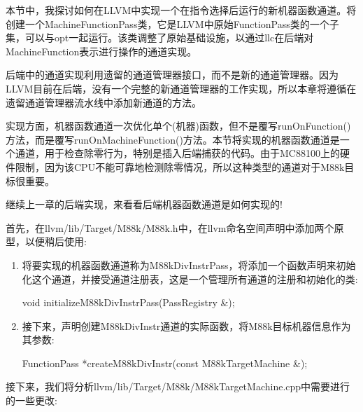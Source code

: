 
本节中，我探讨如何在LLVM中实现一个在指令选择后运行的新机器函数通道。将创建一个MachineFunctionPass类，它是LLVM中原始FunctionPass类的一个子集，可以与opt一起运行。该类调整了原始基础设施，以通过llc在后端对MachineFunction表示进行操作的通道实现。

后端中的通道实现利用遗留的通道管理器接口，而不是新的通道管理器。因为LLVM目前在后端，没有一个完整的新通道管理器的工作实现，所以本章将遵循在遗留通道管理器流水线中添加新通道的方法。

实现方面，机器函数通道一次优化单个(机器)函数，但不是覆写runOnFunction()方法，而是覆写runOnMachineFunction()方法。本节将实现的机器函数通道是一个通道，用于检查除零行为，特别是插入后端捕获的代码。由于MC88100上的硬件限制，因为该CPU不能可靠地检测除零情况，所以这种类型的通道对于M88k目标很重要。

继续上一章的后端实现，来看看后端机器函数通道是如何实现的!


首先，在llvm/lib/Target/M88k/M88k.h中，在llvm命名空间声明中添加两个原型，以便稍后使用:

\begin{enumerate}
\item
将要实现的机器函数通道称为M88kDivInstrPass，将添加一个函数声明来初始化这个通道，并接受通道注册表，这是一个管理所有通道的注册和初始化的类:

\begin{cpp}
void initializeM88kDivInstrPass(PassRegistry &);
\end{cpp}

\item
接下来，声明创建M88kDivInstr通道的实际函数，将M88k目标机器信息作为其参数:

\begin{cpp}
FunctionPass *createM88kDivInstr(const M88kTargetMachine &);
\end{cpp}
\end{enumerate}


接下来，我们将分析llvm/lib/Target/M88k/M88kTargetMachine.cpp中需要进行的一些更改:

